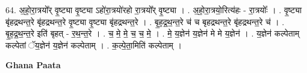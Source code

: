 \documentclass[17pt]{extarticle}
\begin{document}
64. अ॒हो॒रा॒त्रयो᳚र् वृ॒ष्ट्या वृ॒ष्ट्या ऽहो॑रा॒त्रयो॑रहो रा॒त्रयो᳚र् वृ॒ष्ट्या । . अ॒हो॒रा॒त्रयो॒रित्य॑हः - रा॒त्रयोः᳚ । . वृ॒ष्ट्या बृ॑हद्रथन्त॒रे बृ॑हद्रथन्त॒रे वृ॒ष्ट्या वृ॒ष्ट्या बृ॑हद्रथन्त॒रे । . बृ॒ह॒द्र॒थ॒न्त॒रे च॑ च बृहद्रथन्त॒रे बृ॑हद्रथन्त॒रे च॑ । . बृ॒ह॒द्र॒थ॒न्त॒रे इति॑ बृहत् - र॒थ॒न्त॒रे । . च॒ मे॒ मे॒ च॒ च॒ मे॒ । . मे॒ य॒ज्ञेन॑ य॒ज्ञेन॑ मे मे य॒ज्ञेन॑ । . य॒ज्ञेन॑ कल्पेताम् कल्पेतां ॅय॒ज्ञेन॑ य॒ज्ञेन॑ कल्पेताम् । . क॒ल्पे॒ता॒मिति॑ कल्पेताम् । \newline

\textbf{Ghana Paata } \newline
\end{document}
